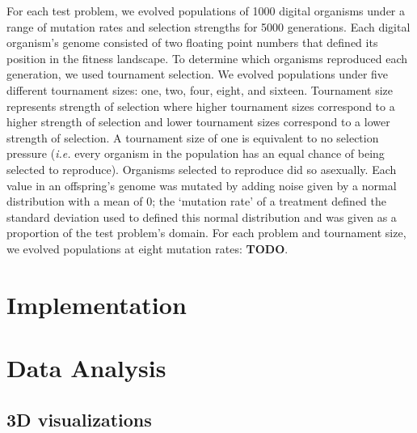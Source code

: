 \documentclass[letterpaper]{article}
\begin{document}
For each test problem, we evolved populations of 1000 digital organisms under a range of mutation rates and selection strengths for 5000 generations. Each digital organism's genome consisted of two floating point numbers that defined its position in the fitness landscape. To determine which organisms reproduced each generation, we used tournament selection. We evolved populations under five different tournament sizes: one, two, four, eight, and sixteen.  Tournament size represents strength of selection where higher tournament sizes correspond to a higher strength of selection and lower tournament sizes correspond to a lower strength of selection. A tournament size of one is equivalent to no selection pressure (\textit{i.e.} every organism in the population has an equal chance of being selected to reproduce). Organisms selected to reproduce did so asexually. Each value in an offspring's genome was mutated by adding noise given by a normal distribution with a mean of 0; the `mutation rate' of a treatment defined the standard deviation used to defined this normal distribution and was given as a proportion of the test problem's domain.  For each problem and tournament size, we evolved populations at eight mutation rates: \textbf{TODO}. 


\section{Implementation}

\section{Data Analysis}
\subsection{3D visualizations}
\end{document}
